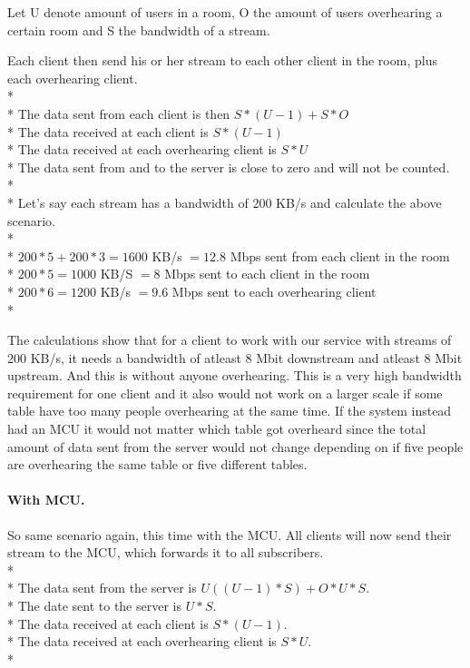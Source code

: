 \documentclass[12pt, titlepage]{article}
\begin{document}
Let U denote amount of users in a room, O the amount of users overhearing a certain room and S the bandwidth of a stream. 

Each client then send his or her stream to each other client in the room, plus each overhearing client.
\\*
\\*
The data sent from each client is then $S*(U-1)+S*O$\\*
The data received at each client is $S*(U-1)$\\*
The data received at each overhearing client is $S*U$\\*
The data sent from and to the server is close to zero and will not be counted.
\\*\\*
Let's say each stream has a bandwidth of 200 KB/s and calculate the above scenario.
\\*
\\*
$200*5 + 200*3 = 1600$ KB/s $= 12.8$ Mbps sent from each client in the room\\*
$200*5 = 1000$ KB/S  $= 8$ Mbps sent to each client in the room\\*
$200*6 = 1200$ KB/s $= 9.6$ Mbps sent to each overhearing client\\*

The calculations show that for a client to work with our service with streams of $200$ KB/s, it needs a bandwidth of atleast 8 Mbit downstream and atleast 8 Mbit upstream. And this is without anyone overhearing. This is a very high bandwidth requirement for one client and it also would not work on a larger scale if some table have too many people overhearing at the same time. If the system instead had an MCU it would not matter which table got overheard since the total amount of data sent from the server would not change depending on if five people are overhearing the same table or five different tables.
\paragraph{With MCU.}
So same scenario again, this time with the MCU. All clients will now send their stream to the MCU, which forwards it to all subscribers.
\\*
\\*
The data sent from the server is $U((U-1)*S) + O*U*S$.\\* 
The date sent to the server is $U*S$.\\*
The data received at each client is $S*(U-1)$.\\*
The data received at each overhearing client is $S*U$.\\*
\end{document}
